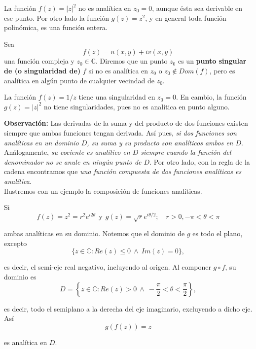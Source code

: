 \begin{ejemplo}
La función $f(z) = |z|^2$ no es analítica en $z_0 = 0$, aunque ésta sea derivable en ese punto. Por otro lado la función $g(z) = z^2$, y en general toda función polinómica, es una función entera.
\end{ejemplo} 

\begin{defi}
Sea $$f(z) = u(x,y) + i v(x,y)$$ una función compleja y $z_0 \in \mathbb{C}$. Diremos que un punto $z_0$ es un \textbf{punto singular de (o singularidad de)} $f$ si no es analítica en $z_0$ o $z_0 \notin Dom(f)$, pero es analítica en algún punto de cualquier vecindad de $z_0$.
\end{defi}

\begin{ejemplo}
La función $f(z) = 1/z$ tiene una singularidad en $z_0 = 0$. En cambio, la función $g(z) = |z|^2$ no tiene singularidades, pues no es analítica en punto alguno.
\end{ejemplo}

\textbf{Observación:} Las derivadas de la suma y del producto de dos funciones existen siempre que ambas funciones tengan derivada. Así pues, \textit{si dos funciones son analíticas en un dominio $D$, su suma y su producto son analíticos ambos en $D$}. Análogamente, \textit{su cociente es analítico en $D$ siempre cuando la función del denominador no se anule en ningún punto de $D$}. Por otro lado, con la regla de la cadena encontramos que \textit{una función compuesta de dos funciones analíticas es analítica}.
\\

Ilustremos con un ejemplo la composición de funciones analíticas.

\begin{ejemplo}
Si 
$$f(z) = z^2 = r^2 e^{i2\theta} ~~\mbox{y}~~ g(z) = \sqrt{r} e^{i \theta /2}; \quad r > 0, - \pi < \theta < \pi$$

ambas analíticas en su dominio. Notemos que el dominio  de $g$ es todo el plano, excepto
$$\{z \in \mathbb{C} : Re(z) \leq 0 ~\wedge~ Im(z) = 0\},$$

es decir, el semi-eje real negativo, incluyendo al origen. Al componer $g \circ f$, su dominio es
$$D = \left\{z \in \mathbb{C} : Re(z) > 0~\wedge~ - \frac{\pi}{2} < \theta < \frac{\pi}{2} \right\},$$

es decir, todo el semiplano a la derecha del eje imaginario, excluyendo a dicho eje. Así
$$g(f(z)) = z $$

es analítica en $D$.
\end{ejemplo}

